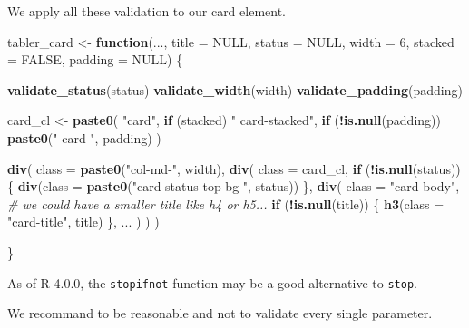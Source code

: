 \documentclass[]{book}
\newenvironment{Shaded}{\begin{snugshade}}{\end{snugshade}}
\newcommand{\CommentTok}[1]{\textcolor[rgb]{0.56,0.35,0.01}{\textit{#1}}}
\newcommand{\ControlFlowTok}[1]{\textcolor[rgb]{0.13,0.29,0.53}{\textbf{#1}}}
\newcommand{\DataTypeTok}[1]{\textcolor[rgb]{0.13,0.29,0.53}{#1}}
\newcommand{\DecValTok}[1]{\textcolor[rgb]{0.00,0.00,0.81}{#1}}
\newcommand{\KeywordTok}[1]{\textcolor[rgb]{0.13,0.29,0.53}{\textbf{#1}}}
\newcommand{\NormalTok}[1]{#1}
\newcommand{\OperatorTok}[1]{\textcolor[rgb]{0.81,0.36,0.00}{\textbf{#1}}}
\newcommand{\OtherTok}[1]{\textcolor[rgb]{0.56,0.35,0.01}{#1}}
\newcommand{\StringTok}[1]{\textcolor[rgb]{0.31,0.60,0.02}{#1}}
\begin{document}
We apply all these validation to our card element.

\begin{Shaded}
\begin{Highlighting}[]
\NormalTok{tabler_card <-}\StringTok{ }\ControlFlowTok{function}\NormalTok{(..., }\DataTypeTok{title =} \OtherTok{NULL}\NormalTok{, }\DataTypeTok{status =} \OtherTok{NULL}\NormalTok{, }\DataTypeTok{width =} \DecValTok{6}\NormalTok{, }\DataTypeTok{stacked =} \OtherTok{FALSE}\NormalTok{, }\DataTypeTok{padding =} \OtherTok{NULL}\NormalTok{) \{}
  
  \KeywordTok{validate_status}\NormalTok{(status)}
  \KeywordTok{validate_width}\NormalTok{(width)}
  \KeywordTok{validate_padding}\NormalTok{(padding)}
  
\NormalTok{  card_cl <-}\StringTok{ }\KeywordTok{paste0}\NormalTok{(}
    \StringTok{"card"}\NormalTok{, }
    \ControlFlowTok{if}\NormalTok{ (stacked) }\StringTok{" card-stacked"}\NormalTok{,}
    \ControlFlowTok{if}\NormalTok{ (}\OperatorTok{!}\KeywordTok{is.null}\NormalTok{(padding)) }\KeywordTok{paste0}\NormalTok{(}\StringTok{" card-"}\NormalTok{, padding)}
\NormalTok{  )}
  
  \KeywordTok{div}\NormalTok{(}
    \DataTypeTok{class =} \KeywordTok{paste0}\NormalTok{(}\StringTok{"col-md-"}\NormalTok{, width),}
    \KeywordTok{div}\NormalTok{(}
      \DataTypeTok{class =}\NormalTok{ card_cl,}
      \ControlFlowTok{if}\NormalTok{ (}\OperatorTok{!}\KeywordTok{is.null}\NormalTok{(status)) \{}
        \KeywordTok{div}\NormalTok{(}\DataTypeTok{class =} \KeywordTok{paste0}\NormalTok{(}\StringTok{"card-status-top bg-"}\NormalTok{, status))}
\NormalTok{      \},}
      \KeywordTok{div}\NormalTok{(}
        \DataTypeTok{class =} \StringTok{"card-body"}\NormalTok{,}
        \CommentTok{# we could have a smaller title like h4 or h5...}
        \ControlFlowTok{if}\NormalTok{ (}\OperatorTok{!}\KeywordTok{is.null}\NormalTok{(title)) \{}
          \KeywordTok{h3}\NormalTok{(}\DataTypeTok{class =} \StringTok{"card-title"}\NormalTok{, title)}
\NormalTok{        \},}
\NormalTok{        ...}
\NormalTok{      )}
\NormalTok{    )}
\NormalTok{  )}
  
\NormalTok{\}}
\end{Highlighting}
\end{Shaded}

As of R 4.0.0, the \texttt{stopifnot} function may be a good alternative to \texttt{stop}.

We recommand to be reasonable and not to validate every single parameter.
\end{document}
